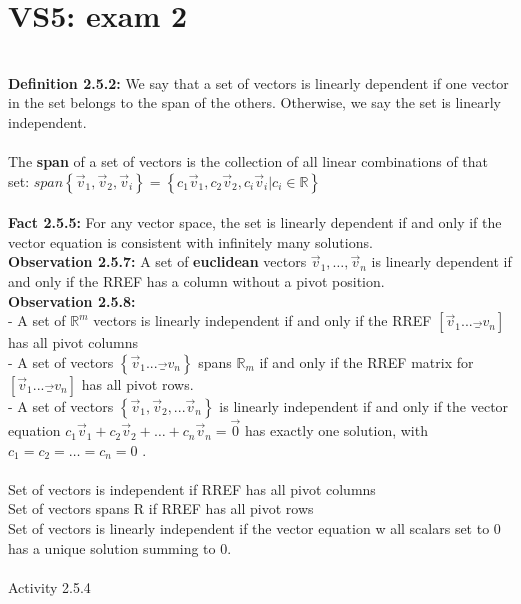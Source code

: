\documentclass{article}
\begin{document}
{\section{VS5: exam 2}\\
\textbf{Definition 2.5.2:} We say that a set of vectors is linearly dependent if one vector in the set belongs to the span of the others. Otherwise, we say the set is linearly independent. \\
\\
The \textbf{span} of a set of vectors is the collection of all linear combinations of that set: $span\left\{\vec{v}_{1}, \vec{v}_{2}, \vec{v}_{i}\right\} = \left\{c_{1}\vec{v}_{1}, c_{2}\vec{v}_{2}, c_{i}\vec{v}_{i} \Bigg| c_{i} \in \mathbb{R} \right\}$\\
\\
\textbf{Fact 2.5.5:} For any vector space, the set is linearly dependent if and only if the vector equation is consistent with infinitely many solutions.\\
\textbf{Observation 2.5.7:} A set of \textbf{euclidean} vectors $\vec{v}_{1}, \dots ,\vec{v}_{n}$ is linearly dependent if and only if the RREF has a column without a pivot position.\\
\textbf{Observation 2.5.8:} \\
- A set of $\mathbb{R}^{m}$ vectors is linearly independent if and only if the RREF $\left[\vec{v}_{1}...\vec_{v}_{n}\right]$ has all pivot columns\\
- A set of vectors $\left\{ \vec{v}_{1}...\vec_{v}_{n} \right\}$ spans $\mathbb{R}_{m}$ if and only if the RREF matrix for $\left[\vec{v}_{1}...\vec_{v}_{n}\right]$ has all pivot rows. \\
- A set of vectors $\left\{ \vec{v}_{1},\vec{v}_{2},...\vec{v}_{n} \right\}$
is linearly independent if and only if the vector equation $ c_{1}\vec{v}_{1} + c_{2}\vec{v}_{2} + \dots + c_{n}\vec{v}_{n} = \vec{0}$
has exactly one solution, with $c_{1} = c_{2} = \dots = c_{n} = 0$ .\\
\\
Set of vectors is independent if RREF has all pivot columns\\
Set of vectors spans R if RREF has all pivot rows\\
Set of vectors is linearly independent if the vector equation w all scalars set to 0 has a unique solution summing to 0. \\
\\
Activity 2.5.4\\
\\
}
\end{document}
